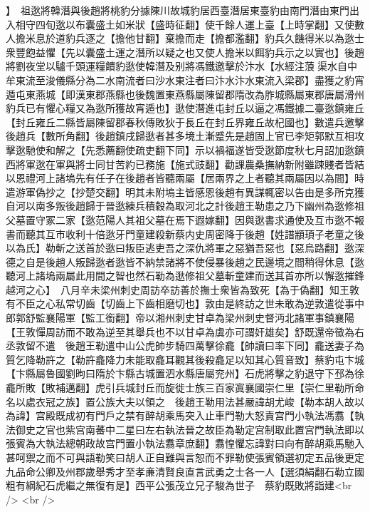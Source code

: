 】　祖逖將韓潛與後趙將桃豹分據陳川故城豹居西臺潛居東臺豹由南門潛由東門出入相守四旬逖以布囊盛土如米狀【盛時征翻】使千餘人運上臺【上時掌翻】又使數人擔米息於道豹兵逐之【擔他甘翻】棄擔而走【擔都濫翻】豹兵久饑得米以為逖士衆豐飽益懼【先以囊盛土運之潛所以疑之也又使人擔米以餌豹兵示之以實也】後趙將劉夜堂以驢千頭運糧饋豹逖使韓潛及别將馮鐵邀擊於汴水【水經注蒗渠水自中牟東流至浚儀縣分為二水南流者曰沙水東注者曰汴水汴水東流入梁郡】盡獲之豹宵遁屯東燕城【即漢東郡燕縣也後魏置東燕縣屬陳留郡隋改為胙城縣屬東郡唐屬滑州豹兵已有懼心糧又為逖所獲故宵遁也】逖使潛進屯封丘以逼之馮鐵據二臺逖鎮雍丘【封丘雍丘二縣皆屬陳留郡春秋傳敗狄于長丘在封丘界雍丘故杞國也】數遣兵邀擊後趙兵【數所角翻】後趙鎮戌歸逖者甚多境土漸蹙先是趙固上官已李矩郭默互相攻擊逖馳使和解之【先悉薦翻使疏吏翻下同】示以禍福遂皆受逖節度秋七月詔加逖鎮西將軍逖在軍與將士同甘苦約已務施【施式豉翻】勸課農桑撫納新附雖踈賤者皆結以恩禮河上諸塢先有任子在後趙者皆聽兩屬【居兩界之上者聽其兩屬因以為間】時遣游軍偽抄之【抄楚交翻】明其未附塢主皆感恩後趙有異謀輒密以告由是多所克獲自河以南多叛後趙歸于晉逖練兵積穀為取河北之計後趙王勒患之乃下幽州為逖修祖父墓置守冢二家【逖范陽人其祖父墓在焉下遐嫁翻】因與逖書求通使及互市逖不報書而聽其互市收利十倍逖牙門童建殺新蔡内史周密降于後趙【姓譜顓頊子老童之後以為氏】勒斬之送首於逖曰叛臣逃吏吾之深仇將軍之惡猶吾惡也【惡烏路翻】逖深德之自是後趙人叛歸逖者逖皆不納禁諸將不使侵暴後趙之民邊境之間稍得休息【逖聽河上諸塢兩屬此用間之智也然石勒為逖修祖父墓斬童建而送其首亦所以懈逖摧鋒越河之心】　八月辛未梁州刺史周訪卒訪善於撫士衆皆為致死【為于偽翻】知王敦有不臣之心私常切齒【切齒上下齒相磨切也】敦由是終訪之世未敢為逆敦遣從事中郎郭舒監襄陽軍【監工銜翻】帝以湘州刺史甘卓為梁州刺史督沔北諸軍事鎮襄陽【王敦憚周訪而不敢為逆至其舉兵也不以甘卓為虞亦可謂奸雄矣】舒既還帝徵為右丞敦留不遣　後趙王勒遣中山公虎帥步騎四萬擊徐龕【帥讀曰率下同】龕送妻子為質乞降勒許之【勒許龕降力未能取龕耳觀其後殺龕足以知其心質音致】蔡豹屯卞城【卞縣屬魯國劉昫曰隋於卞縣古城置泗水縣唐屬兖州】石虎將擊之豹退守下邳為徐龕所敗【敗補邁翻】虎引兵城封丘而旋徙士族三百家寘襄國崇仁里【崇仁里勒所命名以處衣冠之族】置公族大夫以領之　後趙王勒用法甚嚴諱胡尤峻【勒本胡人故以為諱】宫殿既成初有門戶之禁有醉胡乘馬突入止車門勒大怒責宫門小執法馮翥【執法御史之官也紫宫南蕃中二星曰左右執法晉之故臣為勒定宫制取此置宫門執法即以張賓為大執法總朝政故宫門置小執法翥章庶翻】翥惶懼忘諱對曰向有醉胡乘馬馳入甚呵禦之而不可與語勒笑曰胡人正自難與言恕而不罪勒使張賓領選初定五品後更定九品命公卿及州郡歲舉秀才至孝亷清賢良直言武勇之士各一人【選須絹翻石勒立國粗有綱紀石虎繼之無復有是】西平公張茂立兄子駿為世子　蔡豹既敗將詣建<br />
<br />
